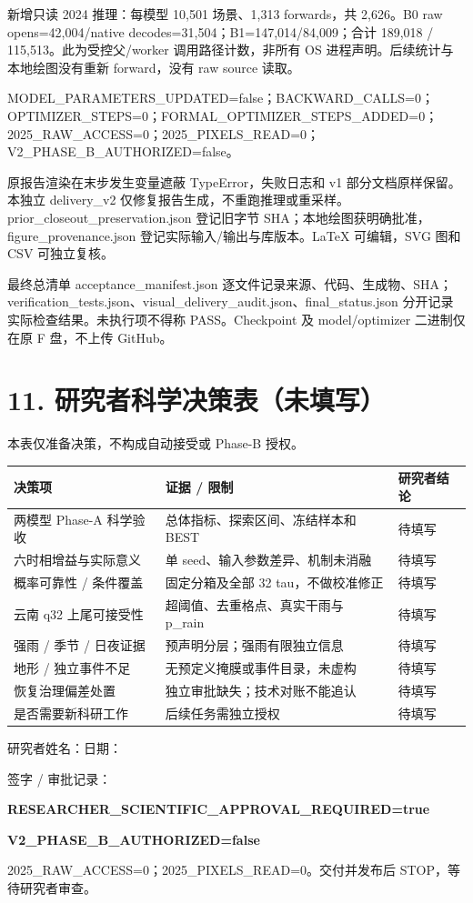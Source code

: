 \documentclass[UTF8,a4paper,10pt,fontset=windows]{ctexart}
\begin{document}
新增只读 2024 推理：每模型 10,501 场景、1,313 forwards，共 2,626。B0 raw opens=42,004/native decodes=31,504；B1=147,014/84,009；合计 189,018 / 115,513。此为受控父/worker 调用路径计数，非所有 OS 进程声明。后续统计与本地绘图没有重新 forward，没有 raw source 读取。

MODEL\_PARAMETERS\_UPDATED=false；BACKWARD\_CALLS=0；OPTIMIZER\_STEPS=0；FORMAL\_OPTIMIZER\_STEPS\_ADDED=0；2025\_RAW\_ACCESS=0；2025\_PIXELS\_READ=0；V2\_PHASE\_B\_AUTHORIZED=false。

原报告渲染在末步发生变量遮蔽 TypeError，失败日志和 v1 部分文档原样保留。本独立 delivery\_v2 仅修复报告生成，不重跑推理或重采样。prior\_closeout\_preservation.json 登记旧字节 SHA；本地绘图获明确批准，figure\_provenance.json 登记实际输入/输出与库版本。LaTeX 可编辑，SVG 图和 CSV 可独立复核。

最终总清单 acceptance\_manifest.json 逐文件记录来源、代码、生成物、SHA；verification\_tests.json、visual\_delivery\_audit.json、final\_status.json 分开记录实际检查结果。未执行项不得称 PASS。Checkpoint 及 model/optimizer 二进制仅在原 F 盘，不上传 GitHub。
\newpage
\section*{11. 研究者科学决策表（未填写）}
本表仅准备决策，不构成自动接受或 Phase-B 授权。
\begin{longtable}{p{.28\linewidth}p{.34\linewidth}p{.28\linewidth}}\toprule
决策项 & 证据 / 限制 & 研究者结论\\\midrule
两模型 Phase-A 科学验收 & 总体指标、探索区间、冻结样本和 BEST & 待填写\\
六时相增益与实际意义 & 单 seed、输入参数差异、机制未消融 & 待填写\\
概率可靠性 / 条件覆盖 & 固定分箱及全部 32 tau，不做校准修正 & 待填写\\
云南 q32 上尾可接受性 & 超阈值、去重格点、真实干雨与 p\_rain & 待填写\\
强雨 / 季节 / 日夜证据 & 预声明分层；强雨有限独立信息 & 待填写\\
地形 / 独立事件不足 & 无预定义掩膜或事件目录，未虚构 & 待填写\\
恢复治理偏差处置 & 独立审批缺失；技术对账不能追认 & 待填写\\
是否需要新科研工作 & 后续任务需独立授权 & 待填写\\\bottomrule
\end{longtable}
研究者姓名：\underline{\hspace{35mm}}\quad 日期：\underline{\hspace{30mm}}\par
签字 / 审批记录：\underline{\hspace{90mm}}

\textbf{RESEARCHER\_SCIENTIFIC\_APPROVAL\_REQUIRED=true}\par
\textbf{V2\_PHASE\_B\_AUTHORIZED=false}\par
2025\_RAW\_ACCESS=0；2025\_PIXELS\_READ=0。交付并发布后 STOP，等待研究者审查。
\end{document}

